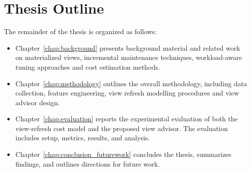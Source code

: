 \section{Thesis Outline}
\label{sec:outline}
The remainder of the thesis is organized as follows:

\begin{itemize}
    \item Chapter~\ref{chap:background} presents background material and related work on materialized views, incremental maintenance techniques, workload-aware tuning approaches and cost estimation methods.
    \item Chapter~\ref{chap:methodology} outlines the overall methodology, including data collection, feature engineering, view refresh modelling procedures and view advisor design.
    \item Chapter~\ref{chap:evaluation} reports the experimental evaluation of both the view-refresh cost model and the proposed view advisor. The evaluation includes setup, metrics, results, and analysis.
    \item Chapter~\ref{chap:conclusion_futurework} concludes the thesis, summarizes findings, and outlines directions for future work.
\end{itemize}
